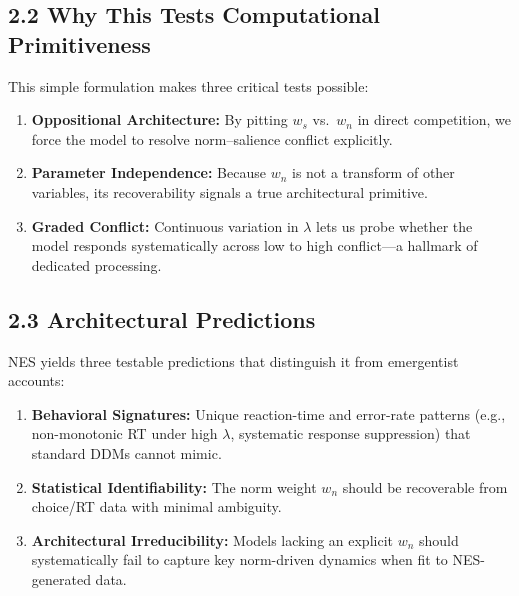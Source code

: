 \documentclass[
  11pt,
]{article}
\providecommand{\tightlist}{%
  \setlength{\itemsep}{0pt}\setlength{\parskip}{0pt}}
\begin{document}
\subsection{2.2 Why This Tests Computational
Primitiveness}\label{why-this-tests-computational-primitiveness}

This simple formulation makes three critical tests possible:

\begin{enumerate}
\def\labelenumi{\arabic{enumi}.}
\tightlist
\item
  \textbf{Oppositional Architecture:} By pitting \(w_s\) vs.~\(w_n\) in
  direct competition, we force the model to resolve norm--salience
  conflict explicitly.\\
\item
  \textbf{Parameter Independence:} Because \(w_n\) is not a transform of
  other variables, its recoverability signals a true architectural
  primitive.\\
\item
  \textbf{Graded Conflict:} Continuous variation in \(\lambda\) lets us
  probe whether the model responds systematically across low to high
  conflict---a hallmark of dedicated processing.
\end{enumerate}

\subsection{2.3 Architectural
Predictions}\label{architectural-predictions}

NES yields three testable predictions that distinguish it from
emergentist accounts:

\begin{enumerate}
\def\labelenumi{\arabic{enumi}.}
\tightlist
\item
  \textbf{Behavioral Signatures:} Unique reaction-time and error-rate
  patterns (e.g., non-monotonic RT under high \(\lambda\), systematic
  response suppression) that standard DDMs cannot mimic.\\
\item
  \textbf{Statistical Identifiability:} The norm weight \(w_n\) should
  be recoverable from choice/RT data with minimal ambiguity.\\
\item
  \textbf{Architectural Irreducibility:} Models lacking an explicit
  \(w_n\) should systematically fail to capture key norm-driven dynamics
  when fit to NES-generated data.
\end{enumerate}
\end{document}
